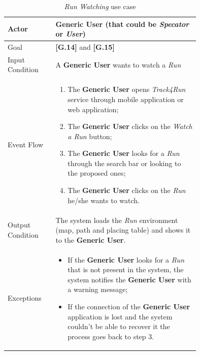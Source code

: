 \begin{center}
\begin{table}
\begin{tabular}{ | l | p{0.75\linewidth} | }
  \hline
    Actor & \textbf{Generic User} (that could be \textit{Specator} or \textit{User}) \\ \hline
    Goal & \textbf{[G.14]} and \textbf{[G.15]} \\ \hline
    Input Condition & A \textbf{Generic User} wants to watch a \textit{Run} \\ \hline
    Event Flow & \begin{minipage}[t]{0.7\textwidth}
      \begin{enumerate}
        \item The \textbf{Generic User} opens \textit{Track4Run} service through mobile application or web application;
        \item The \textbf{Generic User} clicks on the \textit{Watch a Run} button;
        \item The \textbf{Generic User} looks for a \textit{Run} through the search bar or looking to the proposed ones;
        \item The \textbf{Generic User} clicks on the \textit{Run} he/she wants to watch.
      \end{enumerate}
    \smallskip
  \end{minipage} \\ \hline
  Output Condition & The system loads the \textit{Run} environment (map, path and placing table) and  shows it to the \textbf{Generic User}. \\ \hline
  Exceptions & \begin{minipage}[t]{0.7\textwidth}
    \begin{itemize}
      \smallskip
      \item If the \textbf{Generic User} looks for a \textit{Run} that is not present in the system, the system notifies the \textbf{Generic User} with a warning message;
      \item If the connection of the \textbf{Generic User} application is lost and the system couldn't be able to recover it the process goes back to step 3.
    \end{itemize}
    \smallskip
  \end{minipage}  \\ \hline
\end{tabular}
\caption{\textit{Run Watching} use case}
\label{table:visitRunTable}
\end{table}
\end{center}

